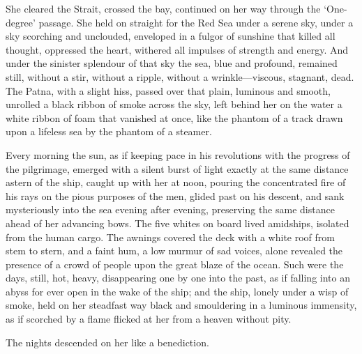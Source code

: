 She cleared the Strait, crossed the bay, continued on her way through the ‘One-degree’ passage. She held on straight for the Red Sea under a serene sky, under a sky scorching and unclouded, enveloped in a fulgor of sunshine that killed all thought, oppressed the heart, withered all impulses of strength and energy. And under the sinister splendour of that sky the sea, blue and profound, remained still, without a stir, without a ripple, without a wrinkle—viscous, stagnant, dead. The Patna, with a slight hiss, passed over that plain, luminous and smooth, unrolled a black ribbon of smoke across the sky, left behind her on the water a white ribbon of foam that vanished at once, like the phantom of a track drawn upon a lifeless sea by the phantom of a steamer.

Every morning the sun, as if keeping pace in his revolutions with the progress of the pilgrimage, emerged with a silent burst of light exactly at the same distance astern of the ship, caught up with her at noon, pouring the concentrated fire of his rays on the pious purposes of the men, glided past on his descent, and sank mysteriously into the sea evening after evening, preserving the same distance ahead of her advancing bows. The five whites on board lived amidships, isolated from the human cargo. The awnings covered the deck with a white roof from stem to stern, and a faint hum, a low murmur of sad voices, alone revealed the presence of a crowd of people upon the great blaze of the ocean. Such were the days, still, hot, heavy, disappearing one by one into the past, as if falling into an abyss for ever open in the wake of the ship; and the ship, lonely under a wisp of smoke, held on her steadfast way black and smouldering in a luminous immensity, as if scorched by a flame flicked at her from a heaven without pity.

The nights descended on her like a benediction. 